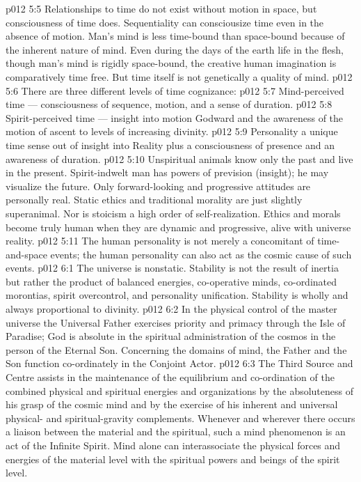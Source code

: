 \vs p012 5:5 \pc Relationships to time do not exist without motion in space, but consciousness of time does. Sequentiality can consciousize time even in the absence of motion. Man’s mind is less time\hyp{}bound than space\hyp{}bound because of the inherent nature of mind. Even during the days of the earth life in the flesh, though man’s mind is rigidly space\hyp{}bound, the creative human imagination is comparatively time free. But time itself is not genetically a quality of mind.
\vs p012 5:6 \pc There are three different levels of time cognizance:
\vs p012 5:7 \bibnobreakspace Mind\hyp{}perceived time --- consciousness of sequence, motion, and a sense of duration.
\vs p012 5:8 \bibnobreakspace Spirit\hyp{}perceived time --- insight into motion Godward and the awareness of the motion of ascent to levels of increasing divinity.
\vs p012 5:9 \bibnobreakspace Personality  a unique time sense out of insight into Reality plus a consciousness of presence and an awareness of duration.
\vs p012 5:10 \pc Unspiritual animals know only the past and live in the present. Spirit\hyp{}indwelt man has powers of prevision (insight); he may visualize the future. Only forward\hyp{}looking and progressive attitudes are personally real. Static ethics and traditional morality are just slightly superanimal. Nor is stoicism a high order of self\hyp{}realization. Ethics and morals become truly human when they are dynamic and progressive, alive with universe reality.
\vs p012 5:11 The human personality is not merely a concomitant of time\hyp{}and\hyp{}space events; the human personality can also act as the cosmic cause of such events.
\vs p012 6:1 The universe is nonstatic. Stability is not the result of inertia but rather the product of balanced energies, co\hyp{}operative minds, co\hyp{}ordinated morontias, spirit overcontrol, and personality unification. Stability is wholly and always proportional to divinity.
\vs p012 6:2 In the physical control of the master universe the Universal Father exercises priority and primacy through the Isle of Paradise; God is absolute in the spiritual administration of the cosmos in the person of the Eternal Son. Concerning the domains of mind, the Father and the Son function co\hyp{}ordinately in the Conjoint Actor.
\vs p012 6:3 The Third Source and Centre assists in the maintenance of the equilibrium and co\hyp{}ordination of the combined physical and spiritual energies and organizations by the absoluteness of his grasp of the cosmic mind and by the exercise of his inherent and universal physical\hyp{} and spiritual\hyp{}gravity complements. Whenever and wherever there occurs a liaison between the material and the spiritual, such a mind phenomenon is an act of the Infinite Spirit. Mind alone can interassociate the physical forces and energies of the material level with the spiritual powers and beings of the spirit level.
